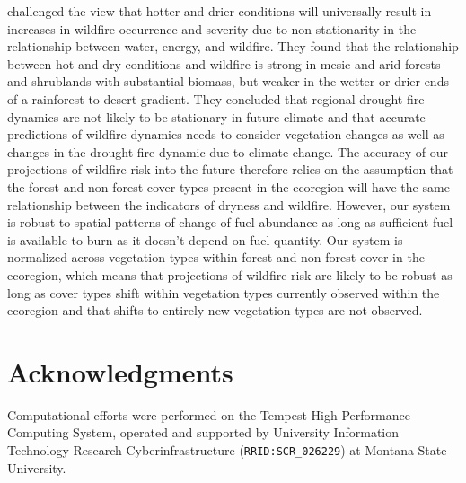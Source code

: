 \documentclass[11p]{article}
\begin{document}
\citet{mckenzieClimateChangeEcohydrology2017} challenged the view that hotter and drier conditions will universally result in increases in wildfire occurrence and severity due to non-stationarity in the relationship between water, energy, and wildfire. They found that the relationship between hot and dry conditions and wildfire is strong in mesic and arid forests and shrublands with substantial biomass, but weaker in the wetter or drier ends of a rainforest to desert gradient. They concluded that regional drought-fire dynamics are not likely to be stationary in future climate and that accurate predictions of wildfire dynamics needs to consider vegetation changes  as well as changes in the drought-fire dynamic due to climate change. The accuracy of our projections of wildfire risk into the future therefore relies on the assumption that the forest and non-forest cover types present in the ecoregion will have the same relationship between the indicators of dryness and wildfire. However, our system is robust to spatial patterns of change of fuel abundance as long as sufficient fuel is available to burn as it doesn't depend on fuel quantity. Our system is normalized across vegetation types within forest and non-forest cover in the ecoregion, which means that projections of wildfire risk are likely to be robust as long as cover types shift within vegetation types currently observed within the ecoregion and that shifts to entirely new vegetation types are not observed.




\section{Acknowledgments}

Computational efforts were performed on the Tempest High Performance Computing System, operated and supported by University Information Technology Research Cyberinfrastructure (\texttt{RRID:SCR\_026229}) at Montana State University.

\clearpage

\printbibliography[
heading=bibintoc,
title={References}
]
\end{document}
